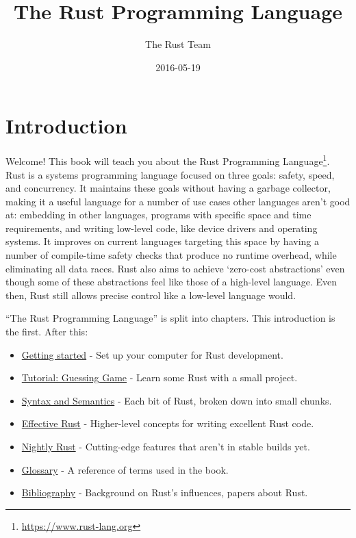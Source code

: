 \documentclass[a4paper,]{book}
\title{The Rust Programming Language}
\author{The Rust Team}
\date{2016-05-19}
\renewcommand{\href}[2]{#2\footnote{\url{#1}}}
\providecommand{\tightlist}{%
  \setlength{\itemsep}{0pt}\setlength{\parskip}{0pt}}
\begin{document}
  \maketitle



{
  \hypersetup{linkcolor=black}
  \setcounter{tocdepth}{2}
  \tableofcontents
  \newpage
}

\chapter{Introduction}\label{introduction}

Welcome! This book will teach you about the
\href{https://www.rust-lang.org}{Rust Programming Language}. Rust is a
systems programming language focused on three goals: safety, speed, and
concurrency. It maintains these goals without having a garbage
collector, making it a useful language for a number of use cases other
languages aren't good at: embedding in other languages, programs with
specific space and time requirements, and writing low-level code, like
device drivers and operating systems. It improves on current languages
targeting this space by having a number of compile-time safety checks
that produce no runtime overhead, while eliminating all data races. Rust
also aims to achieve `zero-cost abstractions' even though some of these
abstractions feel like those of a high-level language. Even then, Rust
still allows precise control like a low-level language would.

``The Rust Programming Language'' is split into chapters. This
introduction is the first. After this:

\begin{itemize}
\tightlist
\item
  \protect\hyperlink{sec--getting-started}{Getting started} - Set up
  your computer for Rust development.
\item
  \protect\hyperlink{sec--guessing-game}{Tutorial: Guessing Game} -
  Learn some Rust with a small project.
\item
  \protect\hyperlink{sec--syntax-and-semantics}{Syntax and Semantics} -
  Each bit of Rust, broken down into small chunks.
\item
  \protect\hyperlink{sec--effective-rust}{Effective Rust} - Higher-level
  concepts for writing excellent Rust code.
\item
  \protect\hyperlink{sec--nightly-rust}{Nightly Rust} - Cutting-edge
  features that aren't in stable builds yet.
\item
  \protect\hyperlink{sec--glossary}{Glossary} - A reference of terms
  used in the book.
\item
  \protect\hyperlink{sec--bibliography}{Bibliography} - Background on
  Rust's influences, papers about Rust.
\end{itemize}
\end{document}
